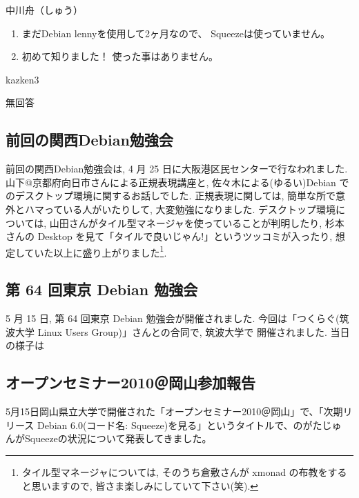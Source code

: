 \documentclass[mingoth,a4paper]{jsarticle}
\begin{document}
\begin{prework}{ 中川舟（しゅう） }
    \begin{enumerate}
          \item 
        まだDebian lennyを使用して2ヶ月なので、
        Squeezeは使っていません。
          \item 
        初めて知りました！
        使った事はありません。
    \end{enumerate}
\end{prework}

\begin{prework}{ kazken3 }

無回答

\end{prework}


\subsection{前回の関西Debian勉強会}

前回の関西Debian勉強会は, 4 月 25 日に大阪港区民センターで行なわれました.
山下@京都府向日市さんによる正規表現講座と,
佐々木による(ゆるい)Debian でのデスクトップ環境に関するお話しでした.
%
正規表現に関しては, 簡単な所で意外とハマっている人がいたりして, 大変勉強になりました.
デスクトップ環境については, 
山田さんがタイル型マネージャを使っていることが判明したり,
杉本さんの Desktop を見て「タイルで良いじゃん!」というツッコミが入ったり,
想定していた以上に盛り上がりました\footnote{%
タイル型マネージャについては, 
そのうち倉敷さんが xmonad の布教をすると思いますので,
皆さま楽しみにしていて下さい(笑).}.

\subsection{第 64 回東京 Debian 勉強会}

5 月 15 日, 第 64 回東京 Debian 勉強会が開催されました.
今回は「つくらぐ(筑波大学 Linux Users Group)」さんとの合同で, 筑波大学で
開催されました.
当日の様子は

\subsection{オープンセミナー2010＠岡山参加報告}

5月15日岡山県立大学で開催された「オープンセミナー2010＠岡山」で、「次期リ
リース Debian 6.0(コード名: Squeeze)を見る」というタイトルで、のがたじゅ
んがSqueezeの状況について発表してきました。
\end{document}
